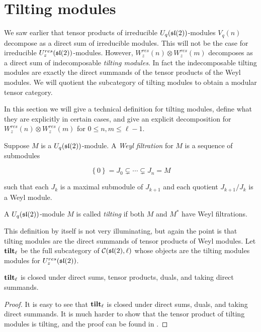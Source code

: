 \section{Tilting modules} 
\label{section:Tilting}

We saw earlier that tensor products of irreducible $U_q(\mathfrak{sl}(2))$-modules
$V_q(n)$ decompose as a direct sum of irreducible modules. This will not be the
case for irreducible $U_z^{res}(\mathfrak{sl}(2))$-modules. However,
$W_z^{res}(n)\otimes W_z^{res}(m)$ decomposes as a direct sum of indecomposable
\emph{tilting modules}. In fact the indecomposable tilting modules are exactly
the direct summands of the tensor products of the Weyl modules. We will
quotient the subcategory of tilting modules to obtain a modular tensor
category. 

In this section we will give a technical definition for tilting modules, define
what they are explicitly in certain cases, and give an explicit decomposition
for $W^{res}_z(n) \otimes W_z^{res}(m)$ for $0 \leq n,m \leq \ell - 1$.

\begin{defn}
    Suppose $M$ is a $U_q(\mathfrak{sl}(2))$-module. A \emph{Weyl filtration} for $M$
    is a sequence of submodules 

    \begin{equation}
        \left\{ 0 \right\} = J_0 \subsetneq \cdots \subsetneq J_n = M
    \end{equation}

    such that each $J_k$ is a maximal submodule of $J_{k+1}$ and each quotient $J_{k+1}/J_k$ is a Weyl module. 
\end{defn}

\begin{defn}
    A $U_q(\mathfrak{sl}(2))$-module $M$ is called \emph{tilting} if both $M$ and $M^*$ have Weyl filtrations.
\end{defn}

This definition by itself is not very illuminating, but again the point is that
tilting modules are the direct summands of tensor products of Weyl modules.
Let $\mathbf{tilt}_\ell$ be the full subcategory of $\mathcal{C}(\mathfrak{sl}(2), \ell)$ whose
objects are the tilting modules modules for $U_z^{res}(\mathfrak{sl}(2))$.  

\begin{prop}
    $\mathbf{tilt}_\ell$ is closed under direct sums, tensor products, duals, and taking direct summands.
\end{prop}
\begin{proof}
    It is easy to see that $\mathbf{tilt}_\ell$ is closed under direct sums, duals, and
    taking direct summands. It is much harder to show that the tensor product
    of tilting modules is tilting, and the proof can be found in \cite{Andersen1992}.
\end{proof}

